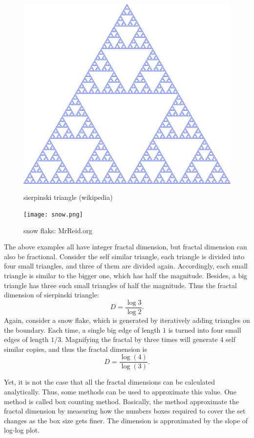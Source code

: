 \documentclass{article}
\begin{document}
 \begin{figure}[H]
  \centering
  \begin{minipage}[b]{0.45\textwidth}
    \includegraphics[width=\textwidth]{triag.png}
    \caption{sierpinski triangle (wikipedia)}
  \end{minipage}
  \hfill
  \begin{minipage}[b]{0.45\textwidth}
    \texttt{[image: snow.png]}
    \caption{snow flaks: MrReid.org}
  \end{minipage}
   \end{figure}
The above examples all have integer fractal dimension, but fractal dimension can also be fractional. Consider the self similar triangle, each triangle is divided into four small triangles, and three of them are divided again. Accordingly, each small triangle is similar to the bigger one, which has half the magnitude. Besides, a big triangle has three such small triangles of half the magnitude. Thus the fractal dimension of sierpinski triangle: $$D = \frac{\log3}{\log2}.$$
Again, consider a snow flake, which is generated by iteratively adding triangles on the boundary. Each time, a single big edge of length $1$ is turned into four small edges of length $1/3$.  Magnifying the fractal by three times will generate 4 self similar copies, and thus the fractal dimension is $$D = \frac{\log(4)}{\log(3)}.$$

Yet, it is not the case that all the fractal dimensions can be calculated analytically. Thus, some methods can be used to approximate this value. One method is called box counting method. Basically, the method approximate the fractal dimension by measuring how the numbers boxes  required to cover the set changes as the box size gets finer. The dimension is approximated by the slope of log-log plot.
\end{document}
